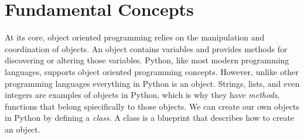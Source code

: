 \section*{Fundamental Concepts}

\begin{comment}
At its core, object oriented programming relies on the manipulation and coordination of objects.
An object represents a piece of code that tracks a state and provides methods for discovering or altering the state.


There are a few concepts that define object oriented programming

\begin{itemize}

\item Abstraction - appropriate representation of states and data

\item Encapsulation - independent behavior

\item Inheritance - relations between objects

\end{itemize}

The general advantage of using these concepts is that it helps with organizing code.
``Abstraction" permits the presentation of only necessary details about an object to the user.
For example, when we ask someone if they own a computer, we can use abstraction to ask the question ``Do you own a computer?'' rather than asking about each and every combination of hardware that we could classify as a computer.
Inheritance helps us easily achieve this abstraction.
We could have an object called \li{Computer}.
Various brands would then subclass, or inherit, the properties of \li{Computer}.
We could continue by having each product line inherit from their respective brands, until we arrive at the product level.
Then each individual product would represent an instantiation of that product's class.
Encapsulation means each function contains all of the data it needs to calculate a result.
Encapsulation is used to avoid the use of global data structures and makes managing data involved in computation more convenient.
\end{comment}
At its core, object oriented programming relies on the manipulation and coordination of objects.
An object contains variables and provides methods for discovering or altering those variables.
Python, like most modern programming languages, supports object oriented programming concepts.
However, unlike other programming languages everything in Python is an object.
Strings, lists, and even integers are examples of objects in Python, which is why they have \emph{methods}, functions that belong spiecifically to those objects.
We can create our own objects in Python by defining a \emph{class}.
A class is a blueprint that describes how to create an object.


